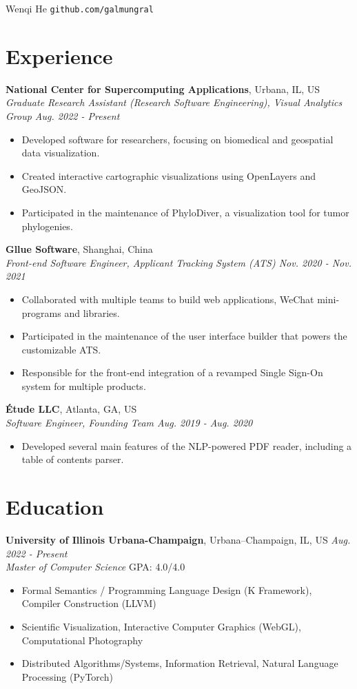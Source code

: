 \documentclass[12pt]{article}
\begin{document}
{\Huge Wenqi He} \quad \texttt{github.com/galmungral}

\section*{Experience}

\textbf{National Center for Supercomputing Applications}, Urbana, IL, US\\
\textit{Graduate Research Assistant (Research Software Engineering), Visual Analytics Group \hfill Aug. 2022 - Present}
\begin{itemize}
\item Developed software for researchers, focusing on biomedical and geospatial data visualization.
\item Created interactive cartographic visualizations using OpenLayers and GeoJSON.
\item Participated in the maintenance of PhyloDiver, a visualization tool for tumor phylogenies.
\end{itemize}

\textbf{Gllue Software}, Shanghai, China\\
\textit{Front-end Software Engineer, Applicant Tracking System (ATS) \hfill Nov. 2020 - Nov. 2021}
\begin{itemize}
\item Collaborated with multiple teams to build web applications, WeChat mini-programs and libraries.
\item Participated in the maintenance of the user interface builder that powers the customizable ATS.
\item Responsible for the front-end integration of a revamped Single Sign-On system for multiple products.
\end{itemize}

\textbf{Étude LLC}, Atlanta, GA, US\\
\textit{Software Engineer, Founding Team \hfill Aug. 2019 - Aug. 2020}
\begin{itemize}
\item Developed several main features of the NLP-powered PDF reader, including a table of contents parser.
\end{itemize}

\section*{Education}
\textbf{University of Illinois Urbana-Champaign}, Urbana–Champaign, IL, US \hfill \textit{Aug. 2022 - Present} \\
\textit{Master of Computer Science}  \hfill GPA: 4.0/4.0 
\begin{itemize}
\small
\item Formal Semantics / Programming Language Design (K Framework), Compiler Construction (LLVM)
\item Scientific Visualization, Interactive Computer Graphics (WebGL), Computational Photography
\item Distributed Algorithms/Systems, Information Retrieval, Natural Language Processing (PyTorch)
\end{itemize}
\end{document}
